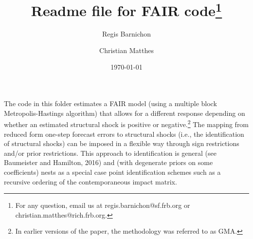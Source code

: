 \documentclass[a4paper,12pt]{article}
\begin{document}
\title{\large{ Readme file for FAIR code\footnote{For any question, email us at regis.barnichon@sf.frb.org or christian.matthes@rich.frb.org.}}}
\author{\normalsize{Regis Barnichon} \and \normalsize{Christian Matthes} }
\date{\footnotesize \today}

	\maketitle
	
The code in this folder estimates a FAIR model (using a multiple block Metropolis-Hastings algorithm) that allows for a different response depending on whether an estimated structural shock is positive or negative.\footnote{In earlier versions of the paper, the methodology was referred to as GMA.} The mapping from reduced form one-step forecast errors to structural shocks (i.e., the identification of structural shocks) can be imposed in a flexible way through sign restrictions and/or prior restrictions. This approach to identification is general (see Baumeister and Hamilton, 2016) and (with degenerate priors on some coefficients) nests as a special case point identification schemes such as a recursive ordering of the contemporaneous impact matrix. \\
\end{document}
